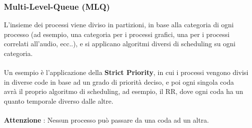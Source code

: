 \documentclass[12pt, letterpaper]{article}
\newcommand{\acc}{\\\hphantom{}\\}
\begin{document}
\subsubsection{Multi-Level-Queue (MLQ)}
L'insieme dei processi viene diviso in partizioni, in base alla categoria 
di ogni processo (ad esempio, una categoria per i processi grafici, una per i processi 
 correlati all'audio, ecc..), e si applicano algoritmi diversi di scheduling 
 su ogni categoria. \acc Un esempio è l'applicazione della \textbf{Strict Priority}, 
 in cui i processi vengono divisi in diverse code in base ad un grado di priorità 
 deciso, e poi ogni singola coda avrà il proprio algoritmo di scheduling, ad esempio, 
 il RR, dove ogni coda ha un quanto temporale diverso dalle altre.
  \acc \textbf{Attenzione} : Nessun processo può passare da una coda ad un altra.
  \begin{figure}[h]
\end{figure}\\
\end{document}
